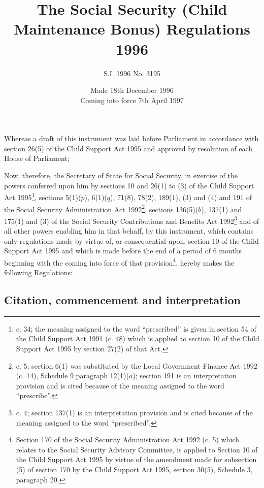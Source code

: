 \documentclass[a4paper]{article}
\title{The Social Security (Child Maintenance Bonus) Regulations 1996}
\author{S.I. 1996 No. 3195}
\date{Made 18th December 1996\\Coming into force 7th April 1997
}
\begin{document}
\maketitle

\noindent
Whereas a draft of this instrument was laid before Parliament in accordance with section 26(5) of the Child Support Act 1995 and approved by resolution of each House of Parliament;

 Now, therefore, the Secretary of State for Social Security, in exercise of the powers conferred upon him by sections 10 and 26(1) to (3) of the Child Support Act 1995\footnote{ c. 34; the meaning assigned to the word “prescribed” is given in section 54 of the Child Support Act 1991 (c. 48) which is applied to section 10 of the Child Support Act 1995 by section 27(2) of that Act.}, sections 5(1)($p$), 6(1)($q$), 71(8), 78(2), 189(1), (3) and (4) and 191 of the Social Security Administration Act 1992\footnote{ c. 5; section 6(1) was substituted by the Local Government Finance Act 1992 (c. 14), Schedule 9 paragraph 12(1)($a$); section 191 is an interpretation provision and is cited because of the meaning assigned to the word “prescribe”.}, sections 136(5)($b$), 137(1) and 175(1) and (3) of the Social Security Contributions and Benefits Act 1992\footnote{ c. 4; section 137(1) is an interpretation provision and is cited because of the meaning assigned to the word “prescribed”.} and of all other powers enabling him in that behalf, by this instrument, which contains only regulations made by virtue of, or consequential upon, section 10 of the Child Support Act 1995 and which is made before the end of a period of 6 months beginning with the coming into force of that provision\footnote{\frenchspacing Section 170 of the Social Security Administration Act 1992 (c. 5) which relates to the Social Security Advisory Committee, is applied to Section 10 of the Child Support Act 1995 by virtue of the amendment made for subsection (5) of section 170 by the Child Support Act 1995, section 30(5), Schedule 3, paragraph 20.}, hereby makes the following Regulations:


{\sloppy

\tableofcontents

}

\setcounter{secnumdepth}{-2}

\subsection[1. Citation, commencement and interpretation]{Citation, commencement and interpretation}
\end{document}
